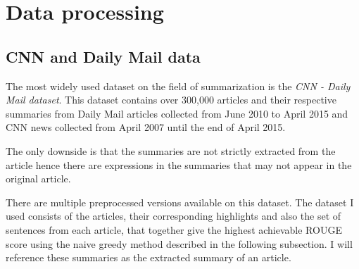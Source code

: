 \chapter{Data processing}\label{sect:DataProcessing}
\section{CNN and Daily Mail data}
The most widely used dataset on the field of summarization is the \textit{CNN - Daily Mail dataset}. 
This dataset contains over 300,000 articles and their respective summaries from Daily Mail articles collected from June 2010 to April 2015 and CNN news collected from April 2007 until the end of April 2015. \cite{CNN_DM}

The only downside is that the summaries are not strictly extracted from the article hence there are expressions in the summaries that may not appear in the original article.

There are multiple preprocessed versions available on this dataset. The dataset I used consists of the articles, their corresponding highlights and also the set of sentences from each article, that together give the highest achievable ROUGE score using the naive greedy method described in the following subsection. I will reference these summaries as the extracted summary of an article.

